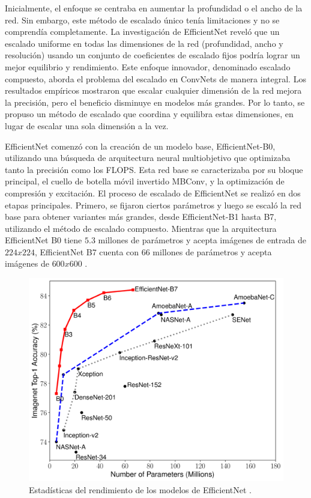 Inicialmente, el enfoque se centraba en aumentar la profundidad o el ancho de la red. Sin embargo, este método de escalado único tenía limitaciones y no se comprendía completamente. La investigación de EfficientNet reveló que un escalado uniforme en todas las dimensiones de la red (profundidad, ancho y resolución) usando un conjunto de coeficientes de escalado fijos podría lograr un mejor equilibrio y rendimiento. Este enfoque innovador, denominado escalado compuesto, aborda el problema del escalado en ConvNets de manera integral. Los resultados empíricos mostraron que escalar cualquier dimensión de la red mejora la precisión, pero el beneficio disminuye en modelos más grandes. Por lo tanto, se propuso un método de escalado que coordina y equilibra estas dimensiones, en lugar de escalar una sola dimensión a la vez.

EfficientNet comenzó con la creación de un modelo base, EfficientNet-B0, utilizando una búsqueda de arquitectura neural multiobjetivo que optimizaba tanto la precisión como los FLOPS. Esta red base se caracterizaba por su bloque principal, el cuello de botella móvil invertido MBConv, y la optimización de compresión y excitación. El proceso de escalado de EfficientNet se realizó en dos etapas principales. Primero, se fijaron ciertos parámetros y luego se escaló la red base para obtener variantes más grandes, desde EfficientNet-B1 hasta B7, utilizando el método de escalado compuesto. Mientras que la arquitectura EfficientNet B0 tiene $5.3$ millones de parámetros y acepta imágenes de entrada de $224x224$, EfficientNet B7 cuenta con $66$ millones de parámetros y acepta imágenes de $600x600$ .
  
   \begin{figure}[ht]%
      \begin{center}
      \includegraphics[width=1\textwidth]{./Graphics/efficientnet_performance.png}
      \caption{Estadísticas del rendimiento de los modelos de EfficientNet .}
      \label{fig:efficientnet_performance}
      \end{center}
      \end{figure}


